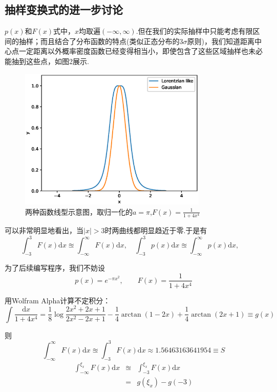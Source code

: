 \documentclass[12pt,a4paper,utf8]{ctexart}
\begin{document}
\subsection{抽样变换式的进一步讨论}

$p(x)$和$F(x)$式中，$x$均取遍$(-\infty,
\infty)$.但在我们的实际抽样中只能考虑有限区间的抽样；而且结合了分布函数的特点(类似正态分布的$3\sigma$原则)，我们知道距离中心点一定距离以外概率密度函数已经变得相当小，即使包含了这些区域抽样也未必能抽到这些点，如图2展示.

\begin{figure}[h]
    \centering
    \includegraphics[width=0.8\textwidth]{funcfig.eps}
    \caption{两种函数线型示意图，取归一化的$a= \pi$,$F(x)= \frac{1}{1+4x^4}$}
\end{figure}

可以非常明显地看出，当$|x| > 3$时两曲线都明显趋近于零.于是有
\begin{equation}
    \int _{-3} ^3 F(x) \textrm{d}x \approxeq \int _{-\infty } ^{\infty} F(x)
    \textrm{d}x,\quad
    \int _{-3} ^3 p(x) \textrm{d}x \approxeq \int _{-\infty } ^{\infty} p(x)
    \textrm{d}x,\quad 
\end{equation}

为了后续编写程序，我们不妨设
\begin{equation}
    p(x) = e^{-\pi x^2}, \qquad F(x) = \frac{1}{1+4x^4}
\end{equation}

用Wolfram Alpha计算不定积分：
\begin{equation}
    \int \frac{ \textrm{d}x}{1+4x^4} = \frac{1}{8} \log{ \frac{2x^2+2x+1}{2x^2-2x+1}} -
    \frac{1}{4} \arctan (1-2x)+ \frac{1}{4}\arctan (2x+1) \equiv g(x)
\end{equation}

则
\begin{equation}
    \int _{-\infty} ^{\infty} F(x) \textrm{d}x \approxeq \int _{-3} ^{3} F(x)
    \textrm{d}x \approx 1.56463163641954 \equiv S		
\end{equation}
\begin{eqnarray}
    \int _{-\infty} ^{\xi_x} F(x) \textrm{d}x &\approxeq& \int _{-3} ^{\xi_x} F(x)
    \textrm{d}x \nonumber \\
                                              &=&
                                              g(\xi_x) - g(-3)
\end{eqnarray}
\end{document}
